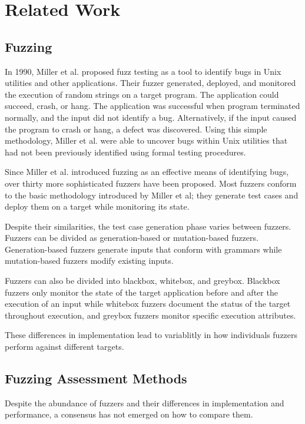 \section{Related Work}

\subsection{Fuzzing}
In 1990, Miller et al. proposed fuzz testing as a tool to identify bugs in Unix utilities and other 
applications. Their fuzzer generated, deployed, and monitored the execution of random strings on a 
target program. The application could succeed, crash, or hang. The application was successful when 
program terminated normally, and the input did not identify a bug. Alternatively, if the input caused 
the program to crash or hang, a defect was discovered. Using this simple methodology, Miller et al. 
were able to uncover bugs within Unix utilities that had not been previously identified using formal 
testing procedures. \cite{miller_empirical_1990}

Since Miller et al. introduced fuzzing as an effective means of identifying bugs, over thirty more 
sophisticated fuzzers have been proposed. Most fuzzers conform to the basic methodology introduced by 
Miller et al; they generate test cases and deploy them on a target while monitoring its state. 

Despite their similarities, the test case generation phase varies between fuzzers. Fuzzers can be 
divided as generation-based or mutation-based fuzzers. Generation-based fuzzers generate inputs that 
conform with grammars while mutation-based fuzzers modify existing inputs. 

Fuzzers can also be divided into blackbox, whitebox, and greybox. Blackbox fuzzers only monitor the 
state of the target application before and after the execution of an input while whitebox fuzzers 
document the status of the target throughout execution, and greybox fuzzers monitor specific 
execution attributes. \cite{zhu_fuzzing_2022}

These differences in implementation lead to variablitly in how individuals fuzzers perform against different
targets.

\subsection{Fuzzing Assessment Methods}
Despite the abundance of fuzzers and their differences in implementation and performance, a consensus
 has not emerged on how to compare them.

